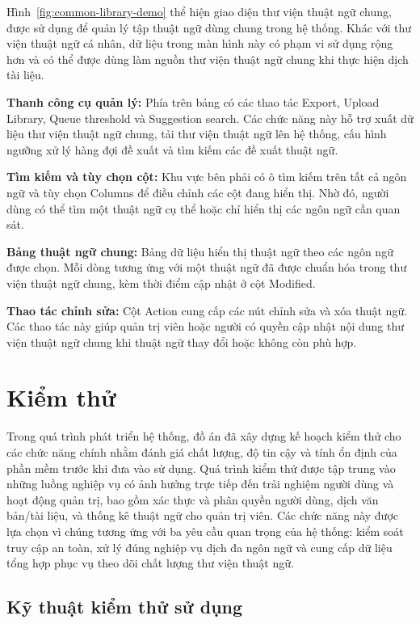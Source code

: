 ﻿\documentclass[../DoAn.tex]{subfiles}
\begin{document}
Hình~\ref{fig:common-library-demo} thể hiện giao diện thư viện thuật ngữ chung, được sử dụng để quản lý tập thuật ngữ dùng chung trong hệ thống. Khác với thư viện thuật ngữ cá nhân, dữ liệu trong màn hình này có phạm vi sử dụng rộng hơn và có thể được dùng làm nguồn thư viện thuật ngữ chung khi thực hiện dịch tài liệu.

\textbf{Thanh công cụ quản lý:} Phía trên bảng có các thao tác Export, Upload Library, Queue threshold và Suggestion search. Các chức năng này hỗ trợ xuất dữ liệu thư viện thuật ngữ chung, tải thư viện thuật ngữ lên hệ thống, cấu hình ngưỡng xử lý hàng đợi đề xuất và tìm kiếm các đề xuất thuật ngữ.

\textbf{Tìm kiếm và tùy chọn cột:} Khu vực bên phải có ô tìm kiếm trên tất cả ngôn ngữ và tùy chọn Columns để điều chỉnh các cột đang hiển thị. Nhờ đó, người dùng có thể tìm một thuật ngữ cụ thể hoặc chỉ hiển thị các ngôn ngữ cần quan sát.

\textbf{Bảng thuật ngữ chung:} Bảng dữ liệu hiển thị thuật ngữ theo các ngôn ngữ được chọn. Mỗi dòng tương ứng với một thuật ngữ đã được chuẩn hóa trong thư viện thuật ngữ chung, kèm thời điểm cập nhật ở cột Modified.

\textbf{Thao tác chỉnh sửa:} Cột Action cung cấp các nút chỉnh sửa và xóa thuật ngữ. Các thao tác này giúp quản trị viên hoặc người có quyền cập nhật nội dung thư viện thuật ngữ chung khi thuật ngữ thay đổi hoặc không còn phù hợp.

\section{Kiểm thử}
Trong quá trình phát triển hệ thống, đồ án đã xây dựng kế hoạch kiểm thử cho các chức năng chính nhằm đánh giá chất lượng, độ tin cậy và tính ổn định của phần mềm trước khi đưa vào sử dụng. Quá trình kiểm thử được tập trung vào những luồng nghiệp vụ có ảnh hưởng trực tiếp đến trải nghiệm người dùng và hoạt động quản trị, bao gồm xác thực và phân quyền người dùng, dịch văn bản/tài liệu, và thống kê thuật ngữ cho quản trị viên. Các chức năng này được lựa chọn vì chúng tương ứng với ba yêu cầu quan trọng của hệ thống: kiểm soát truy cập an toàn, xử lý đúng nghiệp vụ dịch đa ngôn ngữ và cung cấp dữ liệu tổng hợp phục vụ theo dõi chất lượng thư viện thuật ngữ.

\subsection{Kỹ thuật kiểm thử sử dụng}
\end{document}
